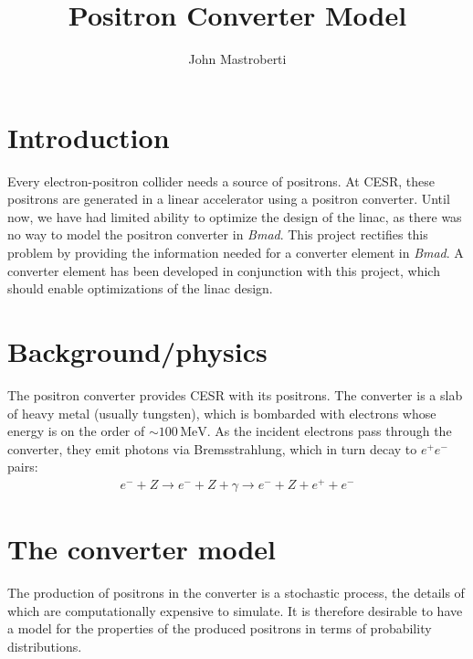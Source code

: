 \documentclass[12pt]{article}
\newcommand{\MeV}{\, \mathrm{MeV}}
\begin{document}
\title{Positron Converter Model}
\author{John Mastroberti}

\maketitle

\newcommand{\dxds}{\frac{dx}{ds}}
\newcommand{\dyds}{\frac{dy}{ds}}
\newcommand{\exes}{\texttt{converter\_simulation}}
\newcommand{\exef}{\texttt{converter\_fitter}}
\newcommand{\configfile}{\texttt{config.txt}}
\newcommand{\bmad}{\textit{Bmad}}

\tableofcontents

\newpage

\section{Introduction}

Every electron-positron collider needs a source of positrons.
At CESR, these positrons are generated in a linear accelerator using a positron converter.
Until now, we have had limited ability to optimize the design of the linac, as there was no way to model the positron converter in \bmad.
This project rectifies this problem by providing the information needed for a converter element in \bmad.
A converter element has been developed in conjunction with this project, which should enable optimizations of the linac design.


\section{Background/physics}
The positron converter provides CESR with its positrons.
The converter is a slab of heavy metal (usually tungsten), which is bombarded with electrons whose energy is on the order of $\sim 100 \MeV$.
As the incident electrons pass through the converter, they emit photons via Bremsstrahlung, which in turn decay to $e^+ e^-$ pairs:
\begin{align}
e^- + Z \rightarrow e^- + Z + \gamma \rightarrow e^- + Z + e^+ + e^-
\end{align}


\section{The converter model}
The production of positrons in the converter is a stochastic process, the details of which are computationally expensive to simulate.
It is therefore desirable to have a model for the properties of the produced positrons in terms of probability distributions.
\end{document}
